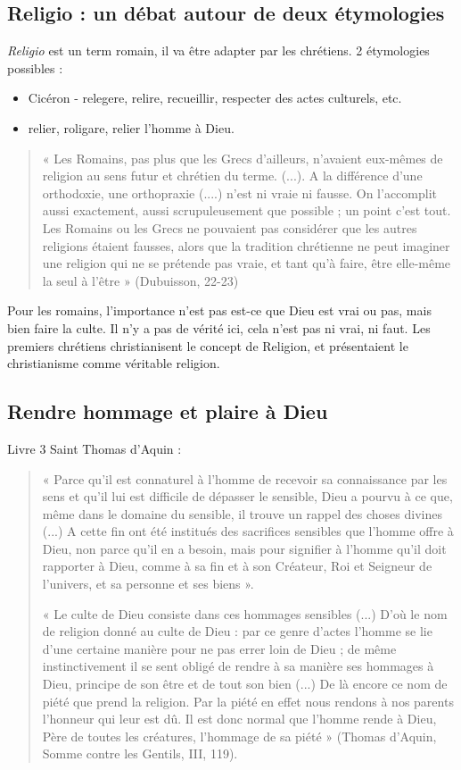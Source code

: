 \subsection{ Religio : un débat autour de deux étymologies}

 
	\emph{Religio} est un term romain, il va être adapter par les chrétiens. 2 étymologies possibles :
	\begin{itemize}
	    \item Cicéron - relegere, relire, recueillir, respecter des actes culturels, etc.
	\item relier, roligare, relier l’homme à Dieu.
	\end{itemize}
	
 \begin{quote}
     	« Les Romains, pas plus que les Grecs d’ailleurs, n’avaient eux-mêmes de religion au sens futur et chrétien du terme. (...). A la différence d’une orthodoxie, une orthopraxie (....) n’est ni vraie ni fausse. On l’accomplit aussi exactement, aussi scrupuleusement que possible ; un point c’est tout. Les Romains ou les Grecs ne pouvaient pas considérer que les autres religions étaient fausses, alors que la tradition chrétienne ne peut imaginer une religion qui ne se prétende pas vraie, et tant qu’à faire, être elle-même la seul à l’être » (Dubuisson, 22-23)
 \end{quote}

	Pour les romains, l’importance n’est pas est-ce que Dieu est vrai ou pas, mais bien faire la culte. Il n’y a pas de vérité ici, cela n’est pas ni vrai, ni faut.
	Les premiers chrétiens christianisent le concept de Religion, et présentaient le christianisme comme véritable religion. 
\subsection{Rendre hommage et plaire à Dieu }

	Livre 3 Saint Thomas  d’Aquin :
	\begin{quote}
	    	« Parce qu’il est connaturel à l’homme de recevoir sa connaissance par les sens et qu’il lui est difficile de dépasser le sensible, Dieu a pourvu à ce que, même dans le domaine du sensible, il trouve un rappel des choses divines (...) A cette fin ont été institués des sacrifices sensibles que l’homme offre à Dieu, non parce qu’il en a besoin, mais pour signifier à l’homme qu’il doit rapporter à Dieu, comme à sa fin et à son Créateur, Roi et Seigneur de l’univers, et sa personne et ses biens ».

   « Le culte de Dieu consiste dans ces hommages sensibles (...) D’où le nom de religion donné au culte de Dieu : par ce genre d’actes l’homme se lie d’une certaine manière pour ne pas errer loin de Dieu ; de même instinctivement il se sent obligé de rendre à sa manière ses hommages à Dieu, principe de son être et de tout son bien (...) De là encore ce nom de piété que prend la religion. Par la piété en effet nous rendons à nos parents l’honneur qui leur est dû. Il est donc normal que l’homme rende à Dieu, Père de toutes les créatures, l’hommage de sa piété » (Thomas d’Aquin, Somme contre les Gentils, III, 119). 
\end{quote}
